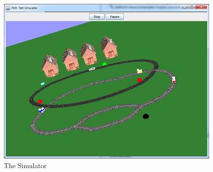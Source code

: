 \begin{figure}[htp]
\begin{center}
  \includegraphics[scale=0.50]{image/gui_simulator.png}
  \caption{The Simulator}
  \label{fig:gui_simulator}
\end{center}
\end{figure}
